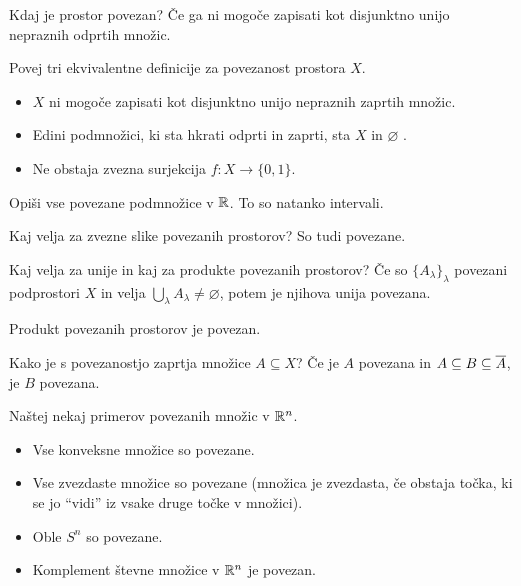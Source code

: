 \begin{vo}{Kdaj je prostor povezan?}
  Če ga ni mogoče zapisati kot disjunktno unijo nepraznih odprtih množic.
\end{vo}

\begin{vo}{Povej tri ekvivalentne definicije za povezanost prostora $X$.}
  \begin{itemize}
	\item $X$ ni mogoče zapisati kot disjunktno unijo nepraznih zaprtih množic.
	\item Edini podmnožici, ki sta hkrati odprti in zaprti, sta $X$ in $\varnothing$ .
	\item Ne obstaja zvezna surjekcija $f: X \to \{0, 1\}$.
  \end{itemize}
\end{vo}


\begin{vo}{Opiši vse povezane podmnožice v $\mathbb{R}$.}
  To so natanko intervali.
\end{vo}

\begin{vo}{Kaj velja za zvezne slike povezanih prostorov?}
  So tudi povezane.
\end{vo}

\begin{vo}{Kaj velja za unije in kaj za produkte povezanih prostorov?}
  Če so $\{A_\lambda\}_\lambda$ povezani podprostori $X$ in velja
  $\bigcup_\lambda A_\lambda \ne \varnothing$, potem je njihova unija povezana.

  Produkt povezanih prostorov je povezan.
\end{vo}

\begin{vo}{Kako je s povezanostjo zaprtja množice $A \subseteq X$?}
  Če je $A$ povezana in $A \subseteq B \subseteq \overline{A}$, je $B$ povezana.
\end{vo}

\begin{vo}{Naštej nekaj primerov povezanih množic v $\mathbb{R}^n$.}
  \begin{itemize}
	\item Vse konveksne množice so povezane.
	\item Vse zvezdaste množice so povezane
	  (množica je zvezdasta, če obstaja točka, ki se jo ``vidi'' iz vsake druge točke v množici).
	\item Oble $S^n$ so povezane.
	\item Komplement števne množice v $\mathbb{R}^n$ je povezan.
  \end{itemize}
\end{vo}


